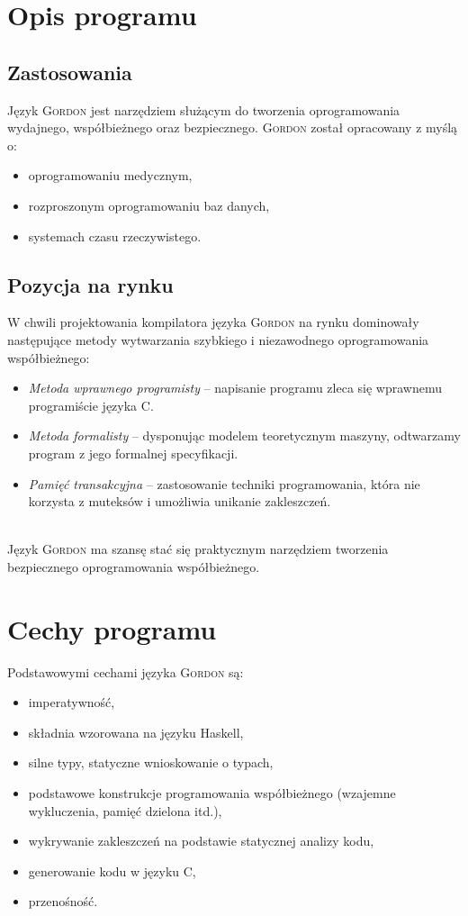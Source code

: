 \documentclass{documentation}
\begin{document}
\section{Opis programu}
\subsection{Zastosowania}
\noindent Język \textsc{Gordon} jest narzędziem służącym do tworzenia
oprogramowania wydajnego, współbieżnego oraz bezpiecznego. 
\textsc{Gordon} został opracowany z myślą o:
\begin{itemize}
    \item oprogramowaniu medycznym,
    \item rozproszonym oprogramowaniu baz danych,
    \item systemach czasu rzeczywistego.
\end{itemize}

\subsection{Pozycja na rynku}
\noindent W chwili projektowania kompilatora języka \textsc{Gordon} na rynku
dominowały następujące metody wytwarzania szybkiego i niezawodnego
oprogramowania współbieżnego:
\begin{itemize}
    \item \emph{Metoda wprawnego programisty} -- napisanie programu zleca się
    wprawnemu programiście języka \textsc{C}.
    \item \emph{Metoda formalisty} -- dysponując modelem teoretycznym maszyny,
    odtwarzamy program z jego formalnej specyfikacji.
    \item \emph{Pamięć transakcyjna} -- zastosowanie techniki programowania,
    która nie korzysta z muteksów i umożliwia unikanie zakleszczeń.
\end{itemize}
~\\
Język \textsc{Gordon} ma szansę stać się praktycznym narzędziem tworzenia
bezpiecznego oprogramowania współbieżnego.

\section{Cechy programu}
\noindent Podstawowymi cechami języka \textsc{Gordon} są:
\begin{itemize}
\item imperatywność,
\item składnia wzorowana na języku Haskell,
\item silne typy, statyczne wnioskowanie o typach,
\item podstawowe konstrukcje programowania współbieżnego (wzajemne wykluczenia,
pamięć dzielona itd.),
\item wykrywanie zakleszczeń na podstawie statycznej analizy kodu,
\item generowanie kodu w języku C,
\item przenośność.
\end{itemize}
\end{document}

